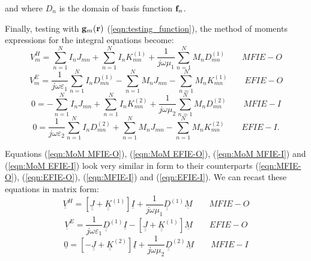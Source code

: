 and where $D_n$ is the domain of basis function $\mathbf{f}_n$.
%
\par
Finally, testing with $\mathbf{g}_m \!\left(\mathbf{r}\right)$ (\ref{eqn:testing_function}), the method of moments expressions for the integral equations become:
\begin{equation}\label{eqn:MoM MFIE-O}
\boxed{V_m^H =  \sum_{n=1}^N I_n J_{mn} + \sum_{n=1}^{N} I_n K_{mn}^{(1)} + \frac{1}{j \omega \mu_1} \sum_{n=1}^{N} M_n D_{mn}^{(1)}} \qquad MFIE-O 
\end{equation}
\begin{equation}\label{eqn:MoM EFIE-O}
\boxed{V_m^E =  \frac{1}{j \omega \varepsilon_1} \sum_{n=1}^{N} I_n D_{mn}^{(1)} - \sum_{n=1}^N M_n J_{mn} - \sum_{n=1}^{N} M_n K_{mn}^{(1)}} \qquad EFIE-O 
\end{equation}
\begin{equation}\label{eqn:MoM MFIE-I}
\boxed{0 =  - \sum_{n=1}^N I_n J_{mn} + \sum_{n=1}^{N} I_n K_{mn}^{(2)} + \frac{1}{j \omega \mu_2} \sum_{n=1}^{N} M_n D_{mn}^{(2)} } \qquad MFIE-I
\end{equation}
\begin{equation}\label{eqn:MoM EFIE-I}
\boxed{0 =   \frac{1}{j \omega \varepsilon_2} \sum_{n=1}^{N} I_n D_{mn}^{(2)} + \sum_{n=1}^N M_n J_{mn} - \sum_{n=1}^{N} M_n K_{mn}^{(2)}} \qquad EFIE-I. 
\end{equation}
%
\par
Equations (\ref{eqn:MoM MFIE-O}), (\ref{eqn:MoM EFIE-O}), (\ref{eqn:MoM MFIE-I}) and (\ref{eqn:MoM EFIE-I}) look very similar in form to their counterparts (\ref{eqn:MFIE-O}), (\ref{eqn:EFIE-O}), (\ref{eqn:MFIE-I}) and (\ref{eqn:EFIE-I}). We can recast these equations in matrix form:
\begin{equation}\label{eqn:Matrix MFIE-O}
\boxed{\underline{V}^H =  \left[\underline{\underline{J}} + \underline{\underline{K}}^{(1)} \right] \underline{I} + \frac{1}{j \omega \mu_1}  \underline{\underline{D}}^{(1)} \underline{M} } \qquad MFIE-O 
\end{equation}
\begin{equation}\label{eqn:Matrix EFIE-O}
\boxed{\underline{V}^E =  \frac{1}{j \omega \varepsilon_1}  \underline{\underline{D}}^{(1)} \underline{I} -\left[\underline{\underline{J}} + \underline{\underline{K}}^{(1)} \right] \underline{M} } \qquad EFIE-O 
\end{equation}
\begin{equation}\label{eqn:Matrix MFIE-I}
\boxed{\underline{0} =  \left[-\underline{\underline{J}} + \underline{\underline{K}}^{(2)} \right] \underline{I} + \frac{1}{j \omega \mu_2}  \underline{\underline{D}}^{(2)} \underline{M} } \qquad MFIE-I
\end{equation}
